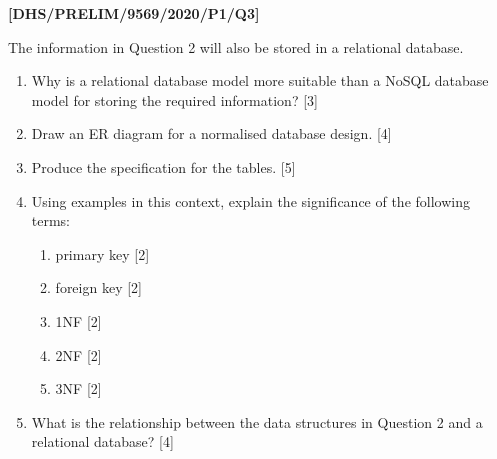 \item \textbf{{[}DHS/PRELIM/9569/2020/P1/Q3{]} }

The information in Question 2 will also be stored in a relational
database. 
\begin{enumerate}
\item Why is a relational database model more suitable than a NoSQL database
model for storing the required information? \hfill{}{[}3{]}
\item Draw an ER diagram for a normalised database design. \hfill{}{[}4{]}
\item Produce the specification for the tables. \hfill{}{[}5{]}
\item Using examples in this context, explain the significance of the following
terms: 
\begin{enumerate}
\item primary key \hfill{}{[}2{]}
\item foreign key \hfill{}{[}2{]}
\item 1NF\hfill{} {[}2{]}
\item 2NF\hfill{} {[}2{]}
\item 3NF \hfill{}{[}2{]}
\end{enumerate}
\item What is the relationship between the data structures in Question 2
and a relational database? \hfill{}{[}4{]}
\end{enumerate}